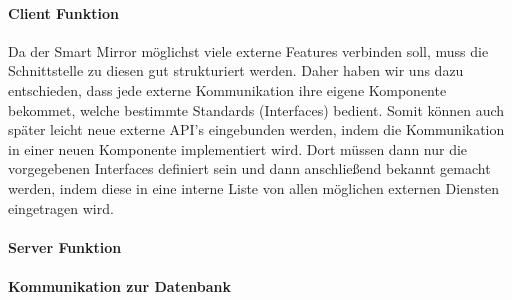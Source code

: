 \paragraph{Client Funktion}
Da der Smart Mirror möglichst viele externe Features verbinden soll, muss die Schnittstelle zu diesen gut strukturiert werden. Daher haben wir uns dazu entschieden, dass jede externe Kommunikation ihre eigene Komponente bekommet, welche bestimmte Standards (Interfaces) bedient. Somit können auch später leicht neue externe API's eingebunden werden, indem die Kommunikation in einer neuen Komponente implementiert wird. Dort müssen dann nur die vorgegebenen Interfaces definiert sein und dann anschließend bekannt gemacht werden, indem diese in eine interne Liste von allen möglichen externen Diensten eingetragen wird.
\paragraph{Server Funktion}

\paragraph{Kommunikation zur Datenbank}

